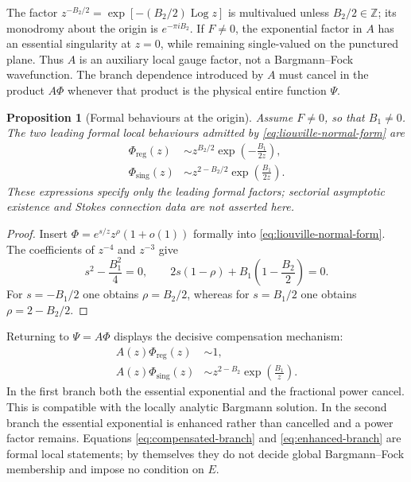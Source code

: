 \documentclass[11pt]{article}
\newtheorem{proposition}[theorem]{Proposition}
\theoremstyle{remark}
\begin{document}
The factor \(z^{-B_2/2}=\exp[-(B_2/2)\operatorname{Log} z]\) is multivalued unless
\(B_2/2\in\mathbb Z\); its monodromy about the origin is
\(e^{-\pi iB_2}\).  If \(F\neq0\), the exponential factor in \(A\) has an
essential singularity at \(z=0\), while remaining single-valued on the
punctured plane.  Thus \(A\) is an auxiliary local gauge factor, not a
Bargmann--Fock wavefunction.  The branch dependence introduced by \(A\) must
cancel in the product \(A\Phi\) whenever that product is the physical entire
function \(\Psi\).

\begin{proposition}[Formal behaviours at the origin]
Assume \(F\neq0\), so that \(B_1\neq0\).  The two leading formal local
behaviours admitted by \eqref{eq:liouville-normal-form} are
\begin{align}
 \Phi_{\mathrm{reg}}(z)
 &\sim z^{B_2/2}\exp\!\left(-\frac{B_1}{2z}\right),
 \label{eq:phi-regular-formal}\\
 \Phi_{\mathrm{sing}}(z)
 &\sim z^{2-B_2/2}\exp\!\left(\frac{B_1}{2z}\right).
 \label{eq:phi-singular-formal}
\end{align}
These expressions specify only the leading formal factors; sectorial
asymptotic existence and Stokes connection data are not asserted here.
\end{proposition}

\begin{proof}
Insert \(\Phi=e^{s/z}z^\rho(1+o(1))\) formally into
\eqref{eq:liouville-normal-form}.  The coefficients of \(z^{-4}\) and
\(z^{-3}\) give
\begin{equation}
 s^2-\frac{B_1^2}{4}=0,
 \qquad
 2s(1-\rho)+B_1\left(1-\frac{B_2}2\right)=0.
\end{equation}
For \(s=-B_1/2\) one obtains \(\rho=B_2/2\), whereas for
\(s=B_1/2\) one obtains \(\rho=2-B_2/2\).
\end{proof}

Returning to \(\Psi=A\Phi\) displays the decisive compensation mechanism:
\begin{align}
 A(z)\Phi_{\mathrm{reg}}(z)&\sim 1,
 \label{eq:compensated-branch}\\
 A(z)\Phi_{\mathrm{sing}}(z)&\sim
 z^{2-B_2}\exp\!\left(\frac{B_1}{z}\right).
 \label{eq:enhanced-branch}
\end{align}
In the first branch both the essential exponential and the fractional power
cancel.  This is compatible with the locally analytic Bargmann solution.  In
the second branch the essential exponential is enhanced rather than cancelled
and a power factor remains.  Equations \eqref{eq:compensated-branch} and
\eqref{eq:enhanced-branch} are formal local statements; by themselves they do
not decide global Bargmann--Fock membership and impose no condition on \(E\).
\end{document}

